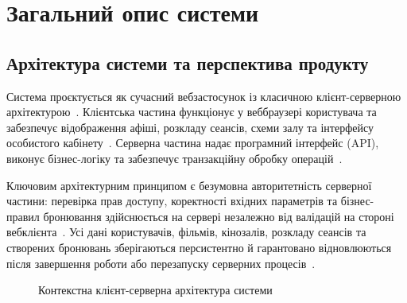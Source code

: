 \section{Загальний опис системи}\label{sec:opis}

\subsection{Архітектура системи та перспектива продукту}\label{sec:opis-arkhitektura}
Система проєктується як сучасний вебзастосунок із класичною клієнт-серверною архітектурою~. Клієнтська частина функціонує у веббраузері користувача та забезпечує відображення афіші, розкладу сеансів, схеми залу та інтерфейсу особистого кабінету~. Серверна частина надає програмний інтерфейс (API), виконує бізнес-логіку та забезпечує транзакційну обробку операцій~.

Ключовим архітектурним принципом є безумовна авторитетність серверної частини: перевірка прав доступу, коректності вхідних параметрів та бізнес-правил бронювання здійснюється на сервері незалежно від валідацій на стороні вебклієнта~. Усі дані користувачів, фільмів, кінозалів, розкладу сеансів та створених бронювань зберігаються персистентно й гарантовано відновлюються після завершення роботи або перезапуску серверних процесів~.

\begin{figure}[htbp]
\centering
{}
\caption{Контекстна клієнт-серверна архітектура системи}\label{fig:architecture}
\end{figure}

